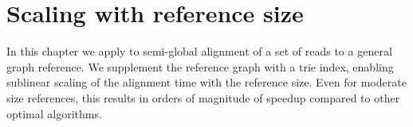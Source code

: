 \chapter{Scaling with reference size} \label{ch:trie}
\graphicspath{{\dir/}}

In this chapter we apply \A to semi-global alignment of a set of reads to a
general graph reference. We supplement the reference graph with a trie index,
enabling sublinear scaling of the alignment time with the reference size. Even
for moderate size references, this results in orders of magnitude of speedup
compared to other optimal algorithms.




